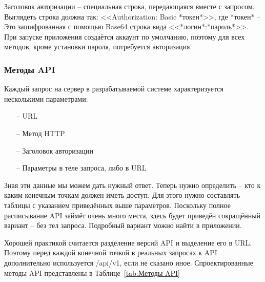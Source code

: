 \documentclass[a4paper,article]{article}
\begin{document}
    Заголовок авторизации -- специальная строка, передающаяся вместе с запросом. Выглядеть строка должна так: <<Authorization: Basic *токен*>>, где *токен* -- Это зашифрованная с помощью Base64 строка вида <<*логин*:*пароль*>>. При запуске приложения создаётся аккаунт по умолчанию, поэтому для всех методов, кроме установки пароля, потребуется авторизация.

    \subsubsection{Методы API}

    Каждый запрос на сервер в разрабатываемой системе характеризуется несколькими параметрами:

    \begin{itemize}[nolistsep]
        \item[--] URL
        \item[--] Метод HTTP
        \item[--] Заголовок авторизации
        \item[--] Параметры в теле запроса, либо в URL
    \end{itemize}

    Зная эти данные мы можем дать нужный ответ. Теперь нужно определить -- кто к каким конечным точкам должен иметь доступ. Для этого нужно составлять таблицы с указанием приведённых выше параметров. Поскольку полное расписывание API займёт очень много места, здесь будет приведён сокращённый вариант -- без тел запроса. Подробный вариант можно найти в приложении.

    Хорошей практикой считается разделение версий API и выделение его в URL. Поэтому перед каждой конечной точкой в реальных запросах к API дополнительно используется /api/v1, если не сказано иное. Спроектированные методы API представлены в Таблице~\ref{tab:Методы API}
\end{document}
